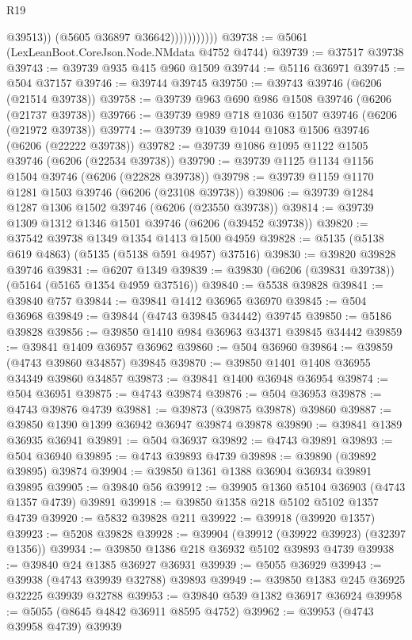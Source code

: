 \begin{lexlean}{R19}
\begin{coremodule}
{{{{{{{{{{{                            @39513))
                        (@5605 @36897 @36642)))))))))))
@39738 := @5061 (LexLeanBoot.CoreJson.Node.NMdata @4752 @4744)
@39739 := @37517 @39738
@39743 := @39739 @935 @415 @960 @1509
@39744 := @5116 @36971
@39745 := @504 @37157
@39746 := @39744 @39745
@39750 := @39743 @39746 (@6206 (@21514 @39738))
@39758 := @39739 @963 @690 @986 @1508 @39746 (@6206 (@21737 @39738))
@39766 := @39739 @989 @718 @1036 @1507 @39746 (@6206 (@21972 @39738))
@39774 := @39739 @1039 @1044 @1083 @1506 @39746 (@6206 (@22222 @39738))
@39782 := @39739 @1086 @1095 @1122 @1505 @39746 (@6206 (@22534 @39738))
@39790 := @39739 @1125 @1134 @1156 @1504 @39746 (@6206 (@22828 @39738))
@39798 := @39739 @1159 @1170 @1281 @1503 @39746 (@6206 (@23108 @39738))
@39806 := @39739 @1284 @1287 @1306 @1502 @39746 (@6206 (@23550 @39738))
@39814 := @39739 @1309 @1312 @1346 @1501 @39746 (@6206 (@39452 @39738))
@39820 := @37542 @39738 @1349 @1354 @1413 @1500 @4959
@39828 := @5135 (@5138 @619 @4863) (@5135 (@5138 @591 @4957) @37516)
@39830 := @39820 @39828 @39746
@39831 := @6207 @1349
@39839 := @39830 (@6206 (@39831 @39738)) (@5164 (@5165 @1354 @4959 @37516))
@39840 := @5538 @39828
@39841 := @39840 @757
@39844 := @39841 @1412 @36965 @36970
@39845 := @504 @36968
@39849 := @39844 (@4743 @39845 @34442) @39745
@39850 := @5186 @39828
@39856 := @39850 @1410 @984 @36963 @34371 @39845 @34442
@39859 := @39841 @1409 @36957 @36962
@39860 := @504 @36960
@39864 := @39859 (@4743 @39860 @34857) @39845
@39870 := @39850 @1401 @1408 @36955 @34349 @39860 @34857
@39873 := @39841 @1400 @36948 @36954
@39874 := @504 @36951
@39875 := @4743 @39874
@39876 := @504 @36953
@39878 := @4743 @39876 @4739
@39881 := @39873 (@39875 @39878) @39860
@39887 := @39850 @1390 @1399 @36942 @36947 @39874 @39878
@39890 := @39841 @1389 @36935 @36941
@39891 := @504 @36937
@39892 := @4743 @39891
@39893 := @504 @36940
@39895 := @4743 @39893 @4739
@39898 := @39890 (@39892 @39895) @39874
@39904 := @39850 @1361 @1388 @36904 @36934 @39891 @39895
@39905 := @39840 @56
@39912 := @39905 @1360 @5104 @36903 (@4743 @1357 @4739) @39891
@39918 := @39850 @1358 @218 @5102 @5102 @1357 @4739
@39920 := @5832 @39828 @211
@39922 := @39918 (@39920 @1357)
@39923 := @5208 @39828
@39928 := @39904 (@39912 (@39922 @39923) (@32397 @1356))
@39934 := @39850 @1386 @218 @36932 @5102 @39893 @4739
@39938 := @39840 @24 @1385 @36927 @36931
@39939 := @5055 @36929
@39943 := @39938 (@4743 @39939 @32788) @39893
@39949 := @39850 @1383 @245 @36925 @32225 @39939 @32788
@39953 := @39840 @539 @1382 @36917 @36924
@39958 := @5055 (@8645 @4842 @36911 @8595 @4752)
@39962 := @39953 (@4743 @39958 @4739) @39939
}}}}}}}}}}}
\end{coremodule}
\end{lexlean}
